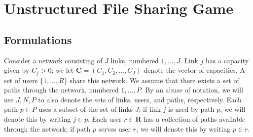 \documentclass[conference]{IEEEtran}
\begin{document}



\begin{comment}
\begin{eqnarray}
\sum_{m=1}^i\sum_{n=1}^js_{mi}q_{mn}s_{nj} &=&
\big(\frac{-1}{\delta}\big)^{i+j}\sum_{m=1}^i\sum_{n=1}^j(-1)^{i+j}{i\choose
m}{j \choose n}q_{mn}\nonumber\\
& = &
\big(\frac{-1}{\delta}\big)^{i+j}\sum_{m=1}^i\sum_{n=1}^j(-1)^{i+j}{i\choose
m}{j \choose n} \Big\{E_\theta
\big[\frac{f(Y|\theta+m\delta)f(Y|\theta+n\delta)}{f^2(Y|\theta)}\big]-1\Big\}
\nonumber\\
&=&
\big(\frac{-1}{\delta}\big)^{i+j}\sum_{m=1}^i\sum_{n=1}^j(-1)^{i+j}{i\choose
m}{j \choose
n} \Big\{ E_{\theta}\Big[\frac{f(Y|\theta+m\delta)f(Y|\theta+n\delta)}{f^2(Y|\theta)}\Big]\nonumber\\
&&\rightarrow E_\theta[\frac{(\partial^{i}f(X,\theta)/
\partial\theta^i)(\partial^{j}f(X,\theta)/\partial\theta^j)}{f^2(X,\theta)}]=w_{ij}(\theta),
\nonumber
\end{eqnarray}

\end{comment}


%
\section{Unstructured File Sharing Game}\label{sec:form}

\subsection{Formulations}

Consider a network consisting of $J$ links, numbered $1, ..., J$.
Link $j$ has a capacity given by $C_j>0$; we let $\mathbf{C}=(C_1,
C_2, ..., C_J)$ denote the vector of capacities. A set of users
$\{1,..., R\}$ share this network. We assume that there exists a set
of paths through the network, numbered $1,...,P$. By an abuse of
notation, we will use $J,N,P$ to also denote the sets of links,
users, and paths, respectively. Each path $p\in P$ uses a subset of
the set of links $J$; if link $j$ is used by path $p$, we will denote
this by writing $j\in p$. Each user $r\in \mathbf{R}$ has a
collection of paths available through the network; if path $p$ serves
user $r$, we will denote this by writing $p\in r$.
\end{document}
